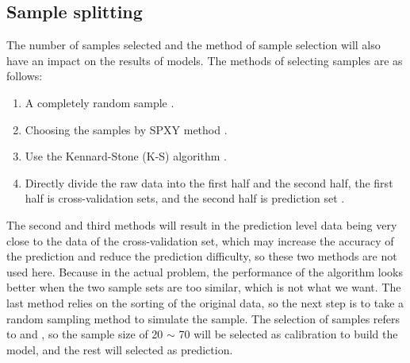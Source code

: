 \documentclass[a4paper,12pt,titlepage]{article} %
\numberwithin{equation}{section}  %
\begin{document}
	\subsection{Sample splitting}
	\label{splitting}
	The number of samples selected and the method of sample selection will also have an impact on the results of models. The methods of selecting samples are as follows:
	
	\begin{enumerate}
	
	\item A completely random sample \citep{1su2006partial}.
	
	\item Choosing the samples by SPXY method \citep{3galvao2007cross}.
	
	\item Use the Kennard-Stone (K-S) algorithm \citep{zhao2015optimization}.
	
	\item Directly divide the raw data into the first half and the second half, the first half is cross-validation sets, and the second half is prediction set \citep{4ergon2006reduced}.

	\end{enumerate}
	
	The second and third methods will result in the prediction level data being very close to the data of the cross-validation set, which may increase the accuracy of the prediction and reduce the prediction difficulty, so these two methods are not used here. Because in the actual problem, the performance of the algorithm looks better when the two sample sets are too similar, which is not what we want. The last method relies on the sorting of the original data, so the next step is to take a random sampling method to simulate the sample. The selection of samples refers to \citet{5zheng2012stability} and \citet{6zheng2015pretreating}, so the sample size of 20 $\sim$ 70 will be selected as calibration to build the model, and the rest will selected as prediction.
	
\end{document}
